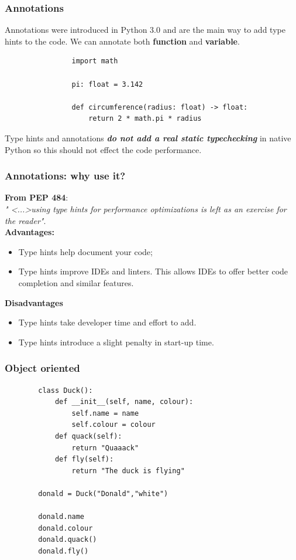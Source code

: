 \documentclass[xcolor ={table,usenames,dvipsnames}]{beamer}
\theoremstyle{definition}
\begin{document}
%		

	\begin{frame}[fragile]
		\frametitle{Annotations}
			Annotations were introduced in Python 3.0 and are the main way to add type hints to the code. We can annotate both \textbf{function} and \textbf{variable}.
			
			\begin{lstlisting}
				import math
				
				pi: float = 3.142
				
				def circumference(radius: float) -> float:
					return 2 * math.pi * radius
			\end{lstlisting}
			
			Type hints and annotations \textbf{\textit{do not add a real static typechecking}} in native Python so this should not effect the code performance.\\
	\end{frame}

	\begin{frame}
		\frametitle{Annotations: why use it?}
		\textbf{From PEP 484}:\\
		\textit{" <...>using type hints for performance optimizations is left as an exercise for the reader"}.\\
		
		\textbf{Advantages:}
		\begin{itemize}
			\item Type hints help document your code;
			\item Type hints improve IDEs and linters. This allows IDEs to offer better code completion and similar features.
		\end{itemize}
		\textbf{Disadvantages}
		\begin{itemize}
			\item Type hints take developer time and effort to add.
			\item Type hints introduce a slight penalty in start-up time.
		\end{itemize}
	\end{frame}

	\begin{frame}[fragile]
		\frametitle{Object oriented}
	\begin{lstlisting}
		class Duck():
			def __init__(self, name, colour):
				self.name = name
				self.colour = colour
			def quack(self):
				return "Quaaack"
			def fly(self):
				return "The duck is flying"
		
		donald = Duck("Donald","white")
				
		donald.name
		donald.colour
		donald.quack()
		donald.fly()
		\end{lstlisting}
	\end{frame}
\end{document}
